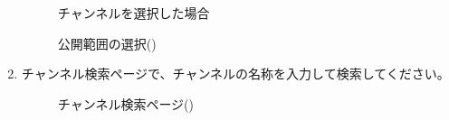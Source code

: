 \begin{enumerate}
\begin{figure}[htbp]
\begin{minipage}[b]{0.45\linewidth}
{                    }
                    \caption{チャンネルを選択した場合}
                    \label{img:guide4}
                \end{minipage}
                \caption*{\mi 公開範囲の選択(\currentVersion)}
            \end{figure}

        \newpage
        \item チャンネル検索ページで、チャンネルの名称を入力して検索してください。
            \begin{figure}[htbp]
                \centering
                \caption{チャンネル検索ページ(\currentVersion)}
                \label{img:guide5}
            \end{figure}


\end{enumerate}
